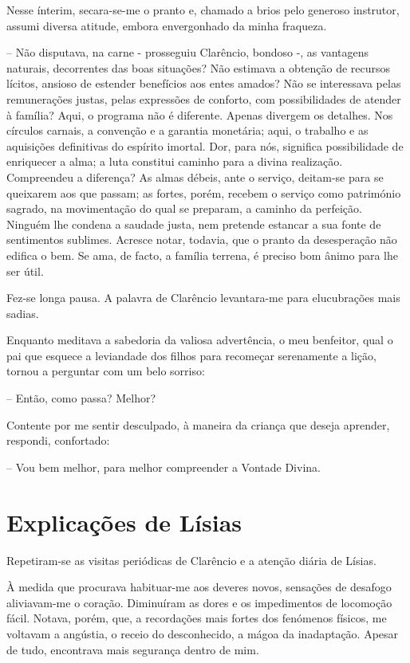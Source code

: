 \documentclass[portuguese,12pt,a4paper]{scrbook}
\begin{document}
	Nesse ínterim, secara-se-me o pranto e, chamado a brios pelo generoso instrutor, assumi diversa atitude, embora envergonhado da minha fraqueza.
	
	– Não disputava, na carne - prosseguiu Clarêncio, bondoso -, as vantagens naturais, decorrentes das boas situações? Não estimava a obtenção de recursos lícitos, ansioso de estender benefícios aos entes amados? Não se interessava pelas remunerações justas, pelas expressões de conforto, com possibilidades de atender à família? Aqui, o programa não é diferente. Apenas divergem os detalhes. Nos círculos carnais, a convenção e a garantia monetária; aqui, o trabalho e as aquisições definitivas do espírito imortal. Dor, para nós, significa possibilidade de enriquecer a alma; a luta constitui caminho para a divina realização. Compreendeu a diferença? As almas débeis, ante o serviço, deitam-se para se queixarem aos que passam; as fortes, porém, recebem o serviço como património sagrado, na movimentação do qual se preparam, a caminho da perfeição. Ninguém lhe condena a saudade justa, nem pretende estancar a sua fonte de sentimentos sublimes. Acresce notar, todavia, que o pranto da desesperação não edifica o bem. Se ama, de facto, a família terrena, é preciso bom ânimo para lhe ser útil.
	
	
	Fez-se longa pausa. A palavra de Clarêncio levantara-me para elucubrações mais sadias.
	
	Enquanto meditava a sabedoria da valiosa advertência, o meu benfeitor, qual o pai que esquece a leviandade dos filhos para recomeçar serenamente a lição, tornou a perguntar com um belo sorriso:
	
	– Então, como passa? Melhor?
	
	Contente por me sentir desculpado, à maneira da criança que deseja aprender, respondi, confortado:
	
	– Vou bem melhor, para melhor compreender a Vontade Divina.
	
	
	\chapter{Explicações de Lísias}
	
	Repetiram-se as visitas periódicas de Clarêncio e a atenção diária de Lísias.
	
	À medida que procurava habituar-me aos deveres novos, sensações de desafogo aliviavam-me o coração. Diminuíram as dores e os impedimentos de locomoção fácil. Notava, porém, que, a recordações mais fortes dos fenómenos físicos, me voltavam a angústia, o receio do desconhecido, a mágoa da inadaptação. Apesar de tudo, encontrava mais segurança dentro de mim.
	
\end{document}

